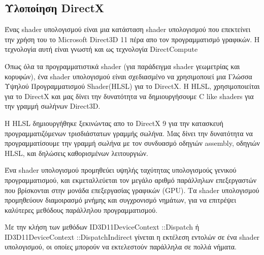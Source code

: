 \subsection{Υλοποίηση DirectX}
Ένας shader υπολογισμού είναι μια κατάσταση shader υπολογισμού που επεκτείνει την χρήση του το Microsoft Direct3D 11 πέρα απο τον προγραμματισμό γραφικών. Η τεχνολογία αυτή είναι γνωστή και ως τεχνολογία DirectCompute\cite{computeshaders-2}

Όπως όλα τα προγραμματιστικά shader (για παράδειγμα shader γεωμετρίας και κορυφών), ένα shader υπολογισμού είναι σχεδιασμένο να χρησιμοποιεί μια Γλώσσα Υψηλού Προγραμματισμού Shader(HLSL) για το DirectX. Η HLSL, χρησιμοποιείται για το DirectX και μας δίνει την δυνατότητα να δημιουργήσουμε C like shaders για την γραμμή σωλήνων Direct3D. 

Η HLSL δημιουργήθηκε ξεκινώντας απο το DirectX 9 για την κατασκευή προγραμματιζόμενων τρισδιάστατων γραμμής σωλήνα. Μας δίνει την δυνατότητα να προγραμματίσουμε την γραμμή σωλήνα με τον συνδυασμό οδηγιών assembly, οδηγιών HLSL, και δηλώσεις καθορισμένων λειτουργιών.

Ένα shader υπολογισμού προμηθεύει υψηλής ταχύτητας υπολογισμούς γενικού προγραμματισμού, και εκμεταλλεύεται τον μεγάλο αριθμό παράλληλων επεξεργαστών που βρίσκονται στην μονάδα επεξεργασίας γραφικών (GPU). Τα shader υπολογισμού προμηθεύουν διαμοιρασμό μνήμης και συγχρονισμό νημάτων, για να επιτρέψει καλύτερες μεθόδους παράλληλου προγραμματισμού. 

Με την κλήση των μεθόδων ID3D11DeviceContext ::Dispatch ή ID3D11DeviceContext ::DispatchIndirect γίνεται η εκτέλεση εντολών σε ένα shader υπολογισμού, οι οποίες μπορούν να εκτελεστούν παράλληλα σε πολλά νήματα.